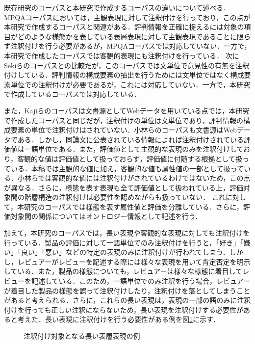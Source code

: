 \documentclass[japanese]{jnlp_1.4}
\begin{document}
既存研究のコーパスと本研究で作成するコーパスの違いについて述べる．MPQAコーパスにおいては，主観表現に対して注釈付けを行っており，この点が本研究で作成するコーパスと関連がある．評判情報を正確に捉えるには対象の項目がどのような様態かを表している表層表現に対して主観表現であることに限らず注釈付けを行う必要があるが，MPQAコーパスでは対応していない．一方で，本研究で作成したコーパスでは客観的表現にも注釈付けを行っている．
次にSekiらのコーパスとの比較だが，このコーパスでは文単位で意見性の有無を注釈付けしている．評判情報の構成要素の抽出を行うためには文単位ではなく構成要素単位での注釈付けが必要であるが，これには対応していない．一方で，本研究で作成しているコーパスでは対応している．

また，Kajiらのコーパスは文書源としてWebデータを用いている点では，本研究で作成したコーパスと同じだが，注釈付けの単位は文単位であり，評判情報の構成要素の単位で注釈付けはされていない．小林らのコーパスも文書源はWebデータである．しかし，同論文に公表されている情報によれば注釈付けされている評価値は一語単位である．また，評価値として主観的な表現のみを注釈付けしており，客観的な値は評価値として扱っておらず，評価値に付随する根拠として扱っている．本稿では主観的な値に加え，客観的な値も属性値の一部として扱っている．小林らでは客観的な値には注釈付けがされているわけではないため，この点が異なる．さらに，様態を表す表現も全て評価値として扱われている上，評価対象間の階層構造の注釈付けは必要性を認めながらも扱っていない．
これに対して，本研究のコーパスでは様態を表す属性値と評価を分離している．さらに，評価対象間の関係についてはオントロジー情報として記述を行う．

加えて，本研究のコーパスでは，長い表現や客観的な表現に対しても注釈付けを行っている．製品の評価に対して一語単位でのみ注釈付けを行うと，「好き」「嫌い」「良い」「悪い」などの特定の表現のみに注釈付けが行われてしまう．しかし，レビュアーがレビューを記述する際には様々な表現を用いて肯定否定を明示している．また，製品の様態についても，レビュアーは様々な様態に着目してレビューを記述している．このため，一語単位でのみ注釈を行う場合，レビュアーが着目した製品の様態を誤って注釈付けしたり，注釈付けを落としてしまうことがあると考えられる．さらに，これらの長い表現は，表現の一部の語のみに注釈付けを行っても正しい注釈にならないため，長い表現を注釈付けする必要性があると考えた．長い表現に注釈付けを行う必要性がある例を図\ref{fig:注釈付け対象となる長い表層表現の例}に示す．

\begin{figure}[t]

\caption{注釈付け対象となる長い表層表現の例}
\label{fig:注釈付け対象となる長い表層表現の例}
\end{figure}
\end{document}
